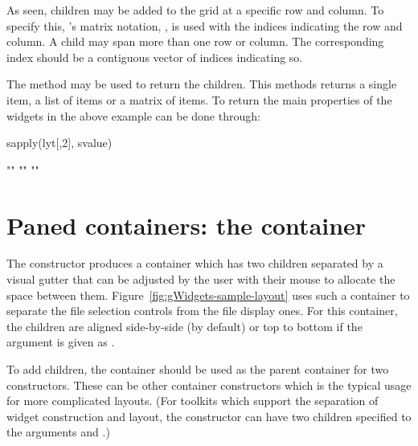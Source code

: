 As seen, children may be added to the grid at a specific row and
column. To specify this, \R's matrix notation, \code{[\ASSIGN}, is
used with the indices indicating the row and column.  A child may span
more than one row or column. The corresponding index should be a
contiguous vector of indices indicating so.  

The \code{[} method may be used to return the children. This methods
returns a single item, a list of items or a matrix of items. To return
the main properties of the widgets in the above example can be done
through:
\begin{Schunk}
\begin{Sinput}
 sapply(lyt[,2], svalue)
\end{Sinput}
\begin{Soutput}
[1] "" "" ""
\end{Soutput}
\end{Schunk}






\section{Paned containers: the  container}
\label{sec:gWidgets-gpanedgroup-container}

The  constructor produces a container which
has two children separated by a visual gutter that can be
adjusted by the user with their mouse to allocate the space between them.
Figure~\ref{fig:gWidgets-sample-layout} uses such a
container to separate the file selection controls from the file
display ones.  For this container, the children are aligned
side-by-side (by default) or top to bottom if the
 argument is given as
. 


To add children, the container should be used as the parent container
for two constructors. These can be other container constructors which
is the typical usage for more complicated layouts.
(For toolkits which support the separation of widget
construction and layout, the  constructor can
have two children specified to the arguments
 and .)

